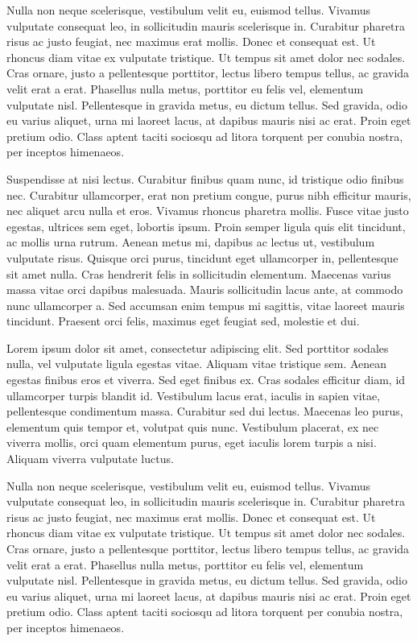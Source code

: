 \documentclass[11pt]{article}
\begin{document}
\twocolumn
Nulla non neque scelerisque, vestibulum velit eu, euismod tellus. Vivamus vulputate consequat leo, in sollicitudin mauris scelerisque in. Curabitur pharetra risus ac justo feugiat, nec maximus erat mollis. Donec et consequat est. Ut rhoncus diam vitae ex vulputate tristique. Ut tempus sit amet dolor nec sodales. Cras ornare, justo a pellentesque porttitor, lectus libero tempus tellus, ac gravida velit erat a erat. Phasellus nulla metus, porttitor eu felis vel, elementum vulputate nisl. Pellentesque in gravida metus, eu dictum tellus. Sed gravida, odio eu varius aliquet, urna mi laoreet lacus, at dapibus mauris nisi ac erat. Proin eget pretium odio. Class aptent taciti sociosqu ad litora torquent per conubia nostra, per inceptos himenaeos.

Suspendisse at nisi lectus. Curabitur finibus quam nunc, id tristique odio finibus nec. Curabitur ullamcorper, erat non pretium congue, purus nibh efficitur mauris, nec aliquet arcu nulla et eros. Vivamus rhoncus pharetra mollis. Fusce vitae justo egestas, ultrices sem eget, lobortis ipsum. Proin semper ligula quis elit tincidunt, ac mollis urna rutrum. Aenean metus mi, dapibus ac lectus ut, vestibulum vulputate risus. Quisque orci purus, tincidunt eget ullamcorper in, pellentesque sit amet nulla. Cras hendrerit felis in sollicitudin elementum. Maecenas varius massa vitae orci dapibus malesuada. Mauris sollicitudin lacus ante, at commodo nunc ullamcorper a. Sed accumsan enim tempus mi sagittis, vitae laoreet mauris tincidunt. Praesent orci felis, maximus eget feugiat sed, molestie et dui.

\onecolumn
Lorem ipsum dolor sit amet, consectetur adipiscing elit. Sed porttitor sodales nulla, vel vulputate ligula egestas vitae. Aliquam vitae tristique sem. Aenean egestas finibus eros et viverra. Sed eget finibus ex. Cras sodales efficitur diam, id ullamcorper turpis blandit id. Vestibulum lacus erat, iaculis in sapien vitae, pellentesque condimentum massa. Curabitur sed dui lectus. Maecenas leo purus, elementum quis tempor et, volutpat quis nunc. Vestibulum placerat, ex nec viverra mollis, orci quam elementum purus, eget iaculis lorem turpis a nisi. Aliquam viverra vulputate luctus.

Nulla non neque scelerisque, vestibulum velit eu, euismod tellus. Vivamus vulputate consequat leo, in sollicitudin mauris scelerisque in. Curabitur pharetra risus ac justo feugiat, nec maximus erat mollis. Donec et consequat est. Ut rhoncus diam vitae ex vulputate tristique. Ut tempus sit amet dolor nec sodales. Cras ornare, justo a pellentesque porttitor, lectus libero tempus tellus, ac gravida velit erat a erat. Phasellus nulla metus, porttitor eu felis vel, elementum vulputate nisl. Pellentesque in gravida metus, eu dictum tellus. Sed gravida, odio eu varius aliquet, urna mi laoreet lacus, at dapibus mauris nisi ac erat. Proin eget pretium odio. Class aptent taciti sociosqu ad litora torquent per conubia nostra, per inceptos himenaeos.
\end{document}
